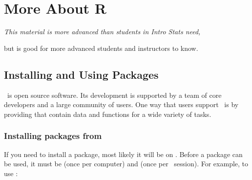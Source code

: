 \chapter{More About R}








\begin{center}
\it
This material is more advanced than students in Intro Stats need, 

\vspace{-4mm}

but is good for more advanced students and instructors to know.
\end{center}

\DefineShortVerb{\&}

\section{Installing and Using Packages}

\R\ is open source software.  Its development is supported by
a team of core developers and a large community of users.
One way that users support
\R\ is by providing  that contain data and functions
for a wide variety of tasks.  

\subsection{Installing packages from \cran}
If you need to install a package, most likely it will be on \cran.
Before a package can be used, it must be  
(once per computer) and 
 (once per \R\ session).  For example, to use :
%
%

\begin{knitrout}
\end{knitrout}


